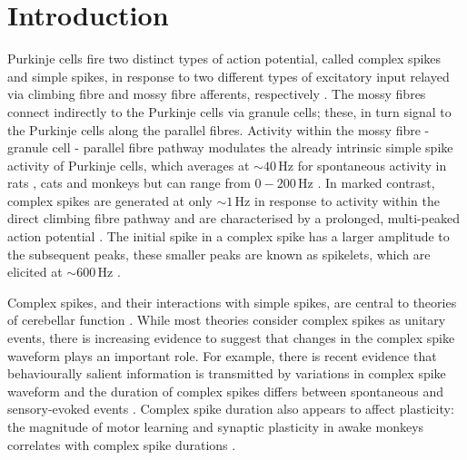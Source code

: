 \documentclass[utf8]{frontiersSCNS} %
\newcommand{\hz}{\,\mathrm{Hz}}
\begin{document}
\section{Introduction}

Purkinje cells fire two distinct types of action potential, called
complex spikes and simple spikes, in response to two different types
of excitatory input relayed via climbing fibre and mossy fibre
afferents, respectively \cite{PalayChanPalay1974, ito1984cerebellum, eccles2013cerebellum}. The mossy fibres connect indirectly to the
Purkinje cells via granule cells; these, in turn signal to the
Purkinje cells along the parallel fibres. Activity within the mossy
fibre - granule cell - parallel fibre pathway modulates the already intrinsic
simple spike activity of Purkinje cells, which averages at $\sim
40\hz$ for spontaneous activity in rats \cite{armstrong1979activity}, cats \cite{thach1967somatosensory} and monkeys \cite{fu1997relationship} but can range from $0-200\hz$ \cite{chen2016cerebellum}. In marked contrast, complex spikes are generated at only $\sim 1\hz$ \cite{lang1999patterns} in response to activity
within the direct climbing fibre pathway and are characterised by a prolonged, multi-peaked action potential \cite{CampbellHesslow1986}. The initial spike in a complex spike has a larger amplitude to the subsequent peaks, these smaller peaks are known as spikelets, which are elicited
at $\sim 600\hz$ \cite{WarnaarEtAl2015,BurroughsEtAl2016}. 


%

Complex spikes, and their interactions with simple spikes, are central to theories of cerebellar function \cite{CampbellHesslow1986, eccles2013cerebellum, ito1984cerebellum, ito2011cerebellum, YangLispberger2014}.  While most theories consider complex spikes as unitary events, there is increasing evidence to suggest that changes in the complex spike waveform plays an important role. For example, there is recent evidence that behaviourally salient information is transmitted by variations in
complex spike waveform and the duration of complex spikes differs
between spontaneous and sensory-evoked events
\cite{MarutaEtAl2007,NajafiMedina2013}. Complex spike duration also
appears to affect plasticity: the magnitude of motor learning and synaptic plasticity in awake
monkeys correlates with complex spike durations \cite{YangLispberger2014}.
\end{document}
